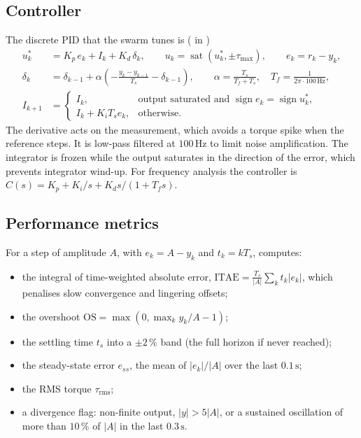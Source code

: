 \documentclass[11pt,a4paper]{article}
\newcommand{\code}[1]{\texttt{\detokenize{#1}}}
\newcommand{\sgn}{\operatorname{sign}}
\newcommand{\sat}{\operatorname{sat}}
\begin{document}
\subsection{Controller}

The discrete PID that the swarm tunes is (\code{DiscretePID} in )
\begin{align}
u_k^{*} &= K_p\,e_k + I_k + K_d\,\delta_k,\qquad u_k = \sat\!\left(u_k^{*}, \pm\tau_{\max}\right),\qquad e_k = r_k - y_k,\\
\delta_k &= \delta_{k-1} + \alpha\left(-\frac{y_k - y_{k-1}}{T_s} - \delta_{k-1}\right),\qquad
\alpha = \frac{T_s}{T_f + T_s},\quad T_f = \frac{1}{2\pi\cdot 100\,\mathrm{Hz}},\\
I_{k+1} &= \begin{cases} I_k, & \text{output saturated and } \sgn e_k = \sgn u_k^{*},\\ I_k + K_i T_s e_k, & \text{otherwise.}\end{cases}
\end{align}
The derivative acts on the measurement, which avoids a torque spike when the reference steps. It is
low-pass filtered at $100\,\mathrm{Hz}$ to limit noise amplification. The integrator is frozen while the
output saturates in the direction of the error, which prevents integrator wind-up. For frequency analysis
the controller is $C(s) = K_p + K_i/s + K_d s/(1 + T_f s)$.

\subsection{Performance metrics}

For a step of amplitude $A$, with $e_k = A - y_k$ and $t_k = kT_s$, \code{step_metrics} computes:
\begin{itemize}[nosep]
  \item the integral of time-weighted absolute error, $\mathrm{ITAE} = \frac{T_s}{|A|}\sum_k t_k|e_k|$,
        which penalises slow convergence and lingering offsets;
  \item the overshoot $\mathrm{OS} = \max(0, \max_k y_k/A - 1)$;
  \item the settling time $t_s$ into a $\pm2\,\%$ band (the full horizon if never reached);
  \item the steady-state error $e_{ss}$, the mean of $|e_k|/|A|$ over the last $0.1\,\mathrm{s}$;
  \item the RMS torque $\tau_{\mathrm{rms}}$;
  \item a divergence flag: non-finite output, $|y| > 5|A|$, or a sustained oscillation of more than $10\,\%$
        of $|A|$ in the last $0.3\,\mathrm{s}$.
\end{itemize}
\end{document}
